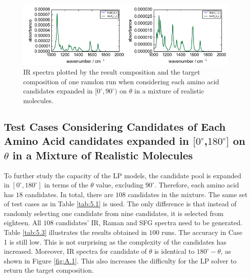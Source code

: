 \begin{figure}[!ht] 
\centering
\includegraphics[scale=0.7]{Figures/chapter5_result_target_residual_plotting__ir_result8_run1.png}
\caption{IR spectra plotted by the result composition and the target composition of one ramdon run when considering each amino acid candidates expanded in $[0^{\circ}, 90^{\circ})$ on $\theta$ in a mixture of realistic molecules.} \label{fig:5.1}
\end{figure}

\subsection{Test Cases Considering Candidates of Each Amino Acid candidates expanded in $[0^{\circ}$,$180^{\circ}]$ on $\theta$ in a Mixture of Realistic Molecules}
To further study the capacity of the LP models, the candidate pool is expanded in $[0^{\circ}, 180^{\circ}]$ in terms of the $\theta$ value, excluding $90^{\circ}$. Therefore, each amino acid has $18$ candidates. In total, there are $108$ candidates in the mixture. The same set of test cases as in Table \ref{tab:5.1} is used. The only difference is that instead of randomly selecting one candidate from nine candidates, it is selected from eighteen. All $108$ candidates' IR, Raman and SFG spectra need to be generated. Table \ref{tab:5.3} illustrates the results obtained in $100$ runs. The accuracy in Case 1 is still low. This is not surprising as the complexity of the candidates has increased. Moreover, IR spectra for candidate of $\theta$ is identical to $180^{\circ}-\theta$, as shown in Figure \ref{fig:A.1}. This also increases the difficulty for the LP solver to return the target composition. \\


